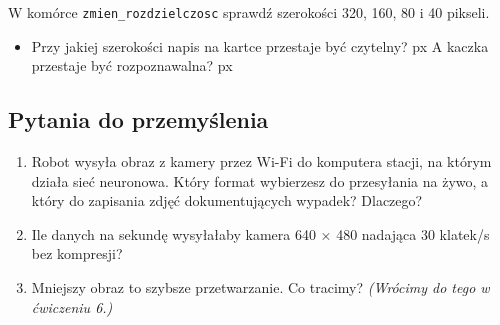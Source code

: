 W komórce \texttt{zmien\_rozdzielczosc} sprawdź szerokości 320, 160, 80 i 40 pikseli.

\begin{itemize}
\tightlist
\item
  Przy jakiej szerokości napis na kartce przestaje być czytelny?  px A kaczka przestaje być rozpoznawalna?  px
\end{itemize}

\subsection{Pytania do przemyślenia}\label{pytania-do-przemyux15blenia}

\begin{enumerate}
\def\labelenumi{\arabic{enumi}.}
\tightlist
\item
  Robot wysyła obraz z kamery przez Wi-Fi do komputera stacji, na którym działa sieć neuronowa. Który format wybierzesz do przesyłania na żywo, a który do zapisania zdjęć dokumentujących wypadek? Dlaczego?
\item
  Ile danych na sekundę wysyłałaby kamera 640 × 480 nadająca 30 klatek/s bez kompresji?
\item
  Mniejszy obraz to szybsze przetwarzanie. Co tracimy? \emph{(Wrócimy do tego w ćwiczeniu 6.)}
\end{enumerate}
